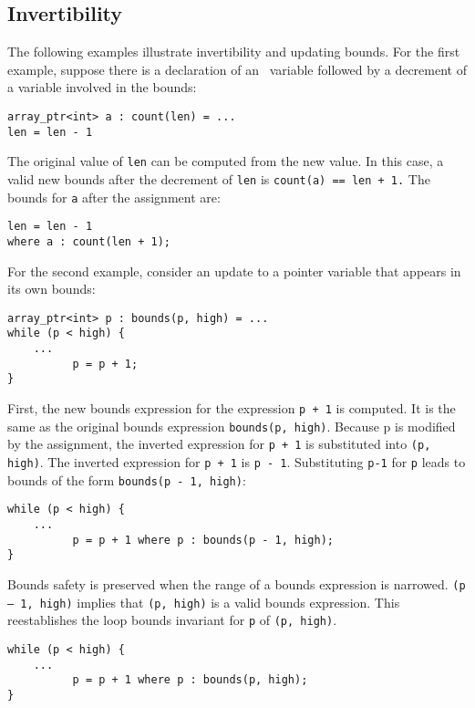 \subsection{Invertibility}\label{invertibility}

The following examples illustrate invertibility and updating bounds. For
the first example, suppose there is a declaration of an
\arrayptr\ variable followed by a decrement of a variable
involved in the bounds:

\begin{verbatim}
array_ptr<int> a : count(len) = ...
len = len - 1
\end{verbatim}

The original value of \texttt{len} can be computed from the new value.
In this case, a valid new bounds after the decrement of \texttt{len} is
\texttt{count(a) == len + 1.} The bounds for \texttt{a} after the
assignment are:
\begin{verbatim}
len = len - 1
where a : count(len + 1);
\end{verbatim}

For the second example, consider an update to a pointer variable that
appears in its own bounds:
\begin{verbatim}
array_ptr<int> p : bounds(p, high) = ...         
while (p < high) {
    ...
          p = p + 1;
}
\end{verbatim}

First, the new bounds expression for the expression \verb|p + 1| is
computed. It is the same as the original bounds expression
\verb|bounds(p, high)|. Because p is modified by the assignment, the
inverted expression for \verb|p + 1| is substituted into 
\verb|(p, high)|. The inverted expression for \verb|p + 1| is \verb|p - 1|.
Substituting \verb|p-1| for \verb|p| leads to bounds of the form
\verb|bounds(p - 1, high)|:

\begin{verbatim}
while (p < high) {
    ...
          p = p + 1 where p : bounds(p - 1, high);
}
\end{verbatim}

Bounds safety is preserved when the range of a bounds expression is
narrowed. \texttt{(p -- 1, high)} implies that \texttt{(p, high)} is a
valid bounds expression. This reestablishes the loop bounds invariant
for \texttt{p} of \texttt{(p, high)}.

\begin{verbatim}
while (p < high) {
    ...
          p = p + 1 where p : bounds(p, high);
}
\end{verbatim}

